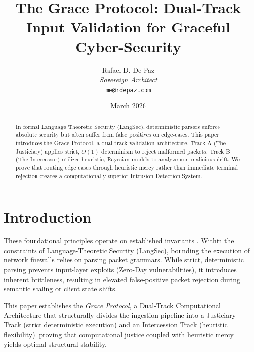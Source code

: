 \documentclass[12pt, a4paper]{article}
\begin{document}
\title{
  \textbf{The Grace Protocol: Dual-Track Input Validation for Graceful Cyber-Security}
}
\author{
  Rafael D. De Paz \\
  \textit{Sovereign Architect} \\
  \texttt{me@rdepaz.com}
}
\date{March 2026}
\maketitle

\begin{abstract}
In formal Language-Theoretic Security (LangSec), deterministic parsers enforce absolute security but often suffer from false positives on edge-cases. This paper introduces the Grace Protocol, a dual-track validation architecture. Track A (The Justiciary) applies strict, $O(1)$ determinism to reject malformed packets. Track B (The Intercessor) utilizes heuristic, Bayesian models to analyze non-malicious drift. We prove that routing edge cases through heuristic mercy rather than immediate terminal rejection creates a computationally superior Intrusion Detection System.
\end{abstract}

\theoremstyle{plain}
\newtheorem{theorem}{Theorem}[section]
\newtheorem{proposition}[theorem]{Proposition}
\newtheorem{lemma}[theorem]{Lemma}

\section{Introduction}
These foundational principles operate on established invariants \cite{sassaman2011language,bratus2014exploits}.
Within the constraints of Language-Theoretic Security (LangSec), bounding the execution of network firewalls relies on parsing packet grammars. While strict, deterministic parsing prevents input-layer exploits (Zero-Day vulnerabilities), it introduces inherent brittleness, resulting in elevated false-positive packet rejection during semantic scaling or client state shifts.

This paper establishes the \textit{Grace Protocol}, a Dual-Track Computational Architecture that structurally divides the ingestion pipeline into a Justiciary Track (strict deterministic execution) and an Intercession Track (heuristic flexibility), proving that computational justice coupled with heuristic mercy yields optimal structural stability.
\end{document}

